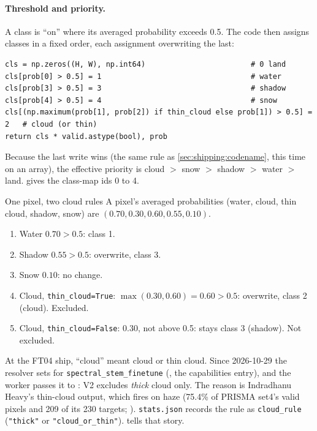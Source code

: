 \paragraph{Threshold and priority.} 
A class is ``on'' where its averaged probability exceeds 0.5. The code then assigns classes in a fixed order, each
assignment overwriting the last:

\begin{lstlisting}
cls = np.zeros((H, W), np.int64)                        # 0 land
cls[prob[0] > 0.5] = 1                                  # water
cls[prob[3] > 0.5] = 3                                  # shadow
cls[prob[4] > 0.5] = 4                                  # snow
cls[(np.maximum(prob[1], prob[2]) if thin_cloud else prob[1]) > 0.5] = 2   # cloud (or thin)
return cls * valid.astype(bool), prob
\end{lstlisting}

Because the last write wins (the same rule as \cref{sec:shipping:codename}, this time on an array), the effective
priority is cloud $>$ snow $>$ shadow $>$ water $>$ land.  gives the class-map ids 0 to 4.

\begin{worked}[label={we:shipping:priority}]{One pixel, two cloud rules}
A pixel's averaged probabilities (water, cloud, thin cloud, shadow, snow) are $(0.70, 0.30, 0.60, 0.55, 0.10)$.
\begin{enumerate}
\item Water $0.70 > 0.5$: class 1.
\item Shadow $0.55 > 0.5$: overwrite, class 3.
\item Snow $0.10$: no change.
\item Cloud, \texttt{thin\_cloud=True}: $\max(0.30, 0.60) = 0.60 > 0.5$: overwrite, class 2 (cloud). Excluded.
\item Cloud, \texttt{thin\_cloud=False}: $0.30$, not above 0.5: stays class 3 (shadow). Not excluded.
\end{enumerate}
\end{worked}

\begin{sourcenote}
At the FT04 ship, ``cloud'' meant cloud or thin cloud. Since 2026-10-29 the resolver sets 
for \texttt{spectral\_stem\_finetune} (, the capabilities entry), and
the worker passes it to : V2 excludes \emph{thick} cloud
only. The reason is Indradhanu Heavy's thin-cloud output, which fires on haze (75.4\% of PRISMA set4's valid pixels and
209 of its 230 targets; ). \texttt{stats.json} records the rule as \texttt{cloud\_rule}
(\texttt{"thick"} or \texttt{"cloud\_or\_thin"}).  tells that story.
\end{sourcenote}

